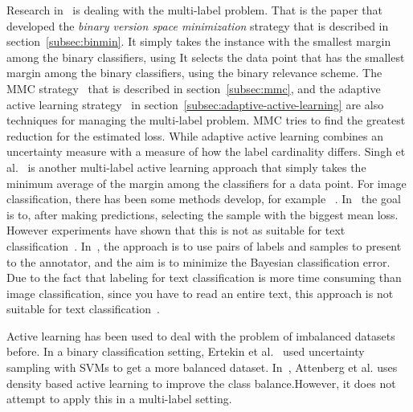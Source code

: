 Research in~\cite{brinker2006active} is dealing with the multi-label problem.
That is the paper that developed the \textit{binary version space minimization} strategy that is described in section~\ref{subsec:binmin}.
It simply takes the instance with the smallest margin among the binary classifiers, using
It selects the data point that has the smallest margin among the binary classifiers, using the binary relevance scheme.
The MMC strategy~\cite{yang2009effective} that is described in section~\ref{subsec:mmc}, and the adaptive active learning strategy~\cite{li2013active} in section~\ref{subsec:adaptive-active-learning} are also techniques for managing the multi-label problem.
MMC tries to find the greatest reduction for the estimated loss.
While adaptive active learning combines an uncertainty measure with a measure of how the label cardinality differs.
Singh et al\@.~\cite{singh2009active} is another multi-label active learning approach that simply takes the minimum average of the margin among the classifiers for a data point.
For image classification, there has been some methods develop, for example ~\cite{li2004multilabel, qi2008two}.
In~\cite{li2004multilabel} the goal is to, after making predictions, selecting the sample with the biggest mean loss.
However experiments have shown that this is not as suitable for text classification~\cite{yang2009effective}.
In~\cite{qi2008two}, the approach is to use pairs of labels and samples to present to the annotator, and the aim is to minimize the Bayesian classification error.
Due to the fact that labeling for text classification is more time consuming than image classification, since you have to read an entire text, this approach is not suitable for text classification~\cite{yang2009effective}.

Active learning has been used to deal with the problem of imbalanced datasets before.
In a binary classification setting, Ertekin et al\@.~\cite{ertekin2007learning} used uncertainty sampling with SVMs to get a more balanced dataset.
In~\cite{attenberg2013class}, Attenberg et al\@. uses density based active learning to improve the class balance.However, it does not attempt to apply this in a multi-label setting.
